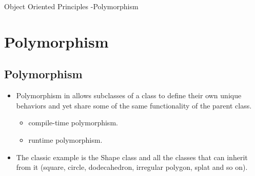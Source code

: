 \documentclass[10pt]{beamer}
\begin{document}
				\begin{frame}{Object Oriented Principles -Polymorphism}
					\section{Polymorphism}
					\subsection{Polymorphism}
					\begin{itemize}
						\item Polymorphism in allows subclasses of a class to define their own unique behaviors and yet share some of the same functionality of the parent class.
					\begin{itemize}
						\item compile-time polymorphism. 
						\item runtime polymorphism.
					\end{itemize} 
					\item The classic example is the Shape class and all the classes that can inherit from it (square, circle, dodecahedron, irregular polygon, splat and so on).
				\end{itemize}
				\end{frame}
				\begin{frame}
					
				
				

				\end{frame}
				\begin{frame}
					
					
					
					
				\end{frame}	
%					
\end{document}
